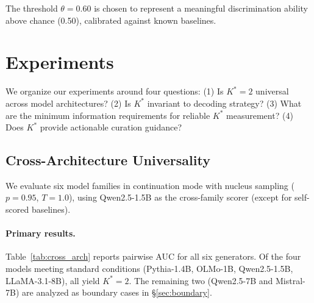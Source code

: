 \documentclass[11pt]{article}
\newcommand{\kstar}{K^{*}}
\newcommand{\thetaval}{\theta}
\begin{document}
The threshold $\thetaval = 0.60$ is chosen to represent a meaningful discrimination ability above chance (0.50), calibrated against known baselines.

\section{Experiments}
\label{sec:experiments}

We organize our experiments around four questions: (1) Is $\kstar = 2$ universal across model architectures? (2) Is $\kstar$ invariant to decoding strategy? (3) What are the minimum information requirements for reliable $\kstar$ measurement? (4) Does $\kstar$ provide actionable curation guidance?

\subsection{Cross-Architecture Universality}
\label{sec:cross_arch}

We evaluate six model families in continuation mode with nucleus sampling ($p = 0.95$, $T = 1.0$), using Qwen2.5-1.5B as the cross-family scorer (except for self-scored baselines).

\paragraph{Primary results.} Table~\ref{tab:cross_arch} reports pairwise AUC for all six generators. Of the four models meeting standard conditions (Pythia-1.4B, OLMo-1B, Qwen2.5-1.5B, LLaMA-3.1-8B), all yield $\kstar = 2$. The remaining two (Qwen2.5-7B and Mistral-7B) are analyzed as boundary cases in \S\ref{sec:boundary}.
\end{document}
